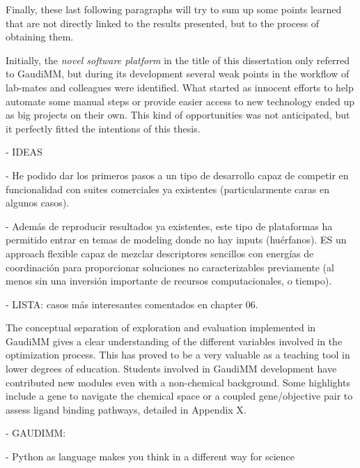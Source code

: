 
Finally, these last following paragraphs will try to sum up some points learned that are not directly linked to the results presented, but to the process of obtaining them.

Initially, the \textit{novel software platform} in the title of this dissertation only referred to GaudiMM, but during its development several weak points in the workflow of lab-mates and colleagues were identified. What started as innocent efforts to help automate some manual steps or provide easier access to new technology ended up as big projects on their own. This kind of opportunities was not anticipated, but it perfectly fitted the intentions of this thesis.

- IDEAS

	- He podido dar los primeros pasos a un tipo de desarrollo capaz de competir en funcionalidad con suites comerciales ya existentes (particularmente caras en algunos casos).

	- Además de reproducir resultados ya existentes, este tipo de plataformas ha permitido entrar en temas de modeling donde no hay inputs (huérfanos). ES un approach flexible capaz de mezclar descriptores sencillos con energías de coordinación para proporcionar soluciones no caracterizables previamente (al menos sin una inversión importante de recursos computacionales, o tiempo).

	- LISTA: casos más interesantes comentados en chapter 06.

	The conceptual separation of exploration and evaluation implemented in GaudiMM gives a clear understanding of the different variables involved in the optimization process. This has proved to be a very valuable as a teaching tool in lower degrees of education. Students involved in GaudiMM development have contributed new modules even with a non-chemical background. Some highlights include a gene to navigate the chemical space or a coupled gene/objective pair to assess ligand binding pathways, detailed in Appendix X.

- GAUDIMM:


-	Python as language makes you think in a different way for science